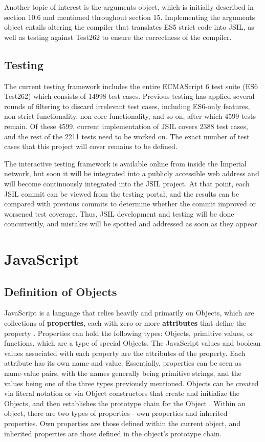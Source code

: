 \documentclass[a4paper,11pt,twoside]{report}
\begin{document}
Another topic of interest is the arguments object, which is initially described in section 10.6 and mentioned throughout section 15. Implementing the arguments object entails altering the compiler that translates ES5 strict code into JSIL, as well as testing against Test262 to ensure the correctness of the compiler.

\section{Testing}
The current testing framework includes the entire ECMAScript 6 test suite (ES6 Test262) which consists of 14998 test cases. Previous testing has applied several rounds of filtering to discard irrelevant test cases, including ES6-only features, non-strict functionality, non-core functionality, and so on, after which 4599 tests remain. Of these 4599, current implementation of JSIL covers 2388 test cases, and the rest of the 2211 tests need to be worked on. The exact number of test cases that this project will cover remains to be defined.

The interactive testing framework is available online from inside the Imperial network, but soon it will be integrated into a publicly accessible web address and will become continuously integrated into the JSIL project. At that point, each JSIL commit can be viewed from the testing portal, and the results can be compared with previous commits to determine whether the commit improved or worsened test coverage. Thus, JSIL development and testing will be done concurrently, and mistakes will be spotted and addressed as soon as they appear.

\chapter{JavaScript}\label{sec:javascript}
\section{Definition of Objects}
JavaScript is a language that relies heavily and primarily on Objects, which are collections of \textbf{properties}, each with zero or more \textbf{attributes} that define the property \cite{EcmaScript}. Properties can hold the following types: Objects, primitive values, or functions, which are a type of special Objects. The JavaScript values and boolean values associated with each property are the attributes of the property. Each attribute has its own name and value. Essentially, properties can be seen as name-value pairs, with the names generally being primitive strings, and the values being one of the three types previously mentioned. Objects can be created via literal notation or via Object constructors that create and initialize the Objects, and then establishes the prototype chain for the Object \cite{EcmaScript}. Within an object, there are two types of properties - own properties and inherited properties. Own properties are those defined within the current object, and inherited properties are those defined in the object's prototype chain.
\end{document}
